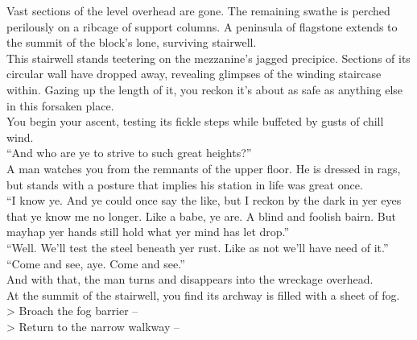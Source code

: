 Vast sections of the level overhead are gone. The remaining swathe is perched perilously on a ribcage of support columns. A peninsula of flagstone extends to the summit of the block’s lone, surviving stairwell.\\

This stairwell stands teetering on the mezzanine’s jagged precipice. Sections of its circular wall have dropped away, revealing glimpses of the winding staircase within. Gazing up the length of it, you reckon it’s about as safe as anything else in this forsaken place.\\

You begin your ascent, testing its fickle steps while buffeted by gusts of chill wind.\\

“And who are ye to strive to such great heights?”\\

A man watches you from the remnants of the upper floor. He is dressed in rags, but stands with a posture that implies his station in life was great once.\\

“I know ye. And ye could once say the like, but I reckon by the dark in yer eyes that ye know me no longer. Like a babe, ye are. A blind and foolish bairn. But mayhap yer hands still hold what yer mind has let drop.”\\

“Well. We’ll test the steel beneath yer rust. Like as not we’ll have need of it.”\\

“Come and see, aye. Come and see.”\\

And with that, the man turns and disappears into the wreckage overhead.\\

At the summit of the stairwell, you find its archway is filled with a sheet of fog.\\

> Broach the fog barrier -- \\
> Return to the narrow walkway -- 
